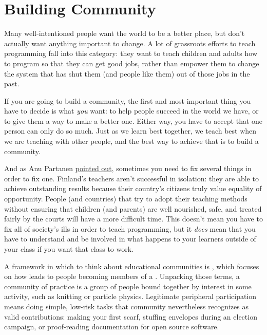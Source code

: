 \chapter{Building Community}\label{s:community}

Many well-intentioned people want the world to be a better place, but
don't actually want anything important to change. A lot of grassroots
efforts to teach programming fall into this category: they want to teach
children and adults how to program so that they can get good jobs,
rather than empower them to change the system that has shut them (and
people like them) out of those jobs in the past.

If you are going to build a community, the first and most important
thing you have to decide is what \emph{you} want: to help people succeed in
the world we have, or to give them a way to make a better one. Either
way, you have to accept that one person can only do so much. Just as we
learn best together, we teach best when we are teaching with other
people, and the best way to achieve that is to build a community.

And as Anu Partanen \href{https://www.theatlantic.com/national/archive/2011/12/what-americans-keep-ignoring-about-finlands-school-success/250564/}{pointed out}, sometimes
you need to fix several things in order to fix one. Finland's teachers
aren't successful in isolation: they are able to achieve outstanding
results because their country's citizens truly value equality of
opportunity. People (and countries) that try to adopt their teaching
methods without ensuring that children (and parents) are well
nourished, safe, and treated fairly by the courts will have a more
difficult time. This doesn't mean you have to fix all of society's
ills in order to teach programming, but it \emph{does} mean that you have
to understand and be involved in what happens to your learners outside
of your class if you want that class to work.

A framework in which to think about educational communities is
, which focuses on how
 leads to people
becoming members of a  \cite{Weng2015}. Unpacking
those terms, a community of practice is a group of people bound
together by interest in some activity, such as knitting or particle
physics. Legitimate peripheral participation means doing simple,
low-risk tasks that community nevertheless recognizes as valid
contributions: making your first scarf, stuffing envelopes during an
election campaign, or proof-reading documentation for open source
software.

